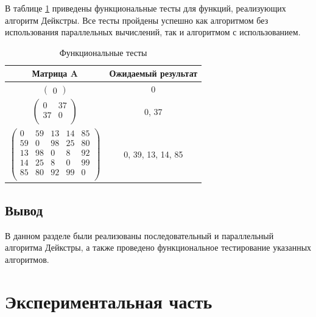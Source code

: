 \documentclass[a4paper,14pt, unknownkeysallowed]{extreport}
\begin{document}
В таблице \ref{tbl:func_test} приведены функциональные тесты для функций, реализующих алгоритм Дейкстры. Все тесты пройдены успешно как алгоритмом без использования параллельных вычислений, так и алгоритмом с использованием.

\begin{table}[h]
    \captionsetup{justification=raggedright,singlelinecheck=off}
    \caption{\label{tbl:func_test} Функциональные тесты}
	\begin{center}
		\begin{tabular}{|c|c|}
			\hline
			Матрица A & Ожидаемый результат \\ 
			\hline
			$\begin{pmatrix}
				0
			\end{pmatrix}$ &
			0 \\
			\hline

			$\begin{pmatrix}
				0 & 37 \\
				37 & 0 \\
			\end{pmatrix}$ &
			0, 37 \\
			\hline
 
			$\begin{pmatrix}
                0 & 59 & 13 & 14 & 85 \\
                59 & 0 & 98 & 25 & 80 \\
                13 & 98 & 0 & 8 & 92 \\
                14 & 25 & 8 & 0 & 99 \\
                85 & 80 & 92 & 99 & 0 \\
			\end{pmatrix}$ &
			 0, 39, 13, 14, 85 \\
			\hline
   
		\end{tabular}
	\end{center}
	
\end{table}

\section*{Вывод}
В данном разделе были реализованы последовательный и параллельный алгоритма Дейкстры, а также проведено функциональное тестирование указанных алгоритмов.
	
\chapter{Экспериментальная часть}
	
\end{document}
